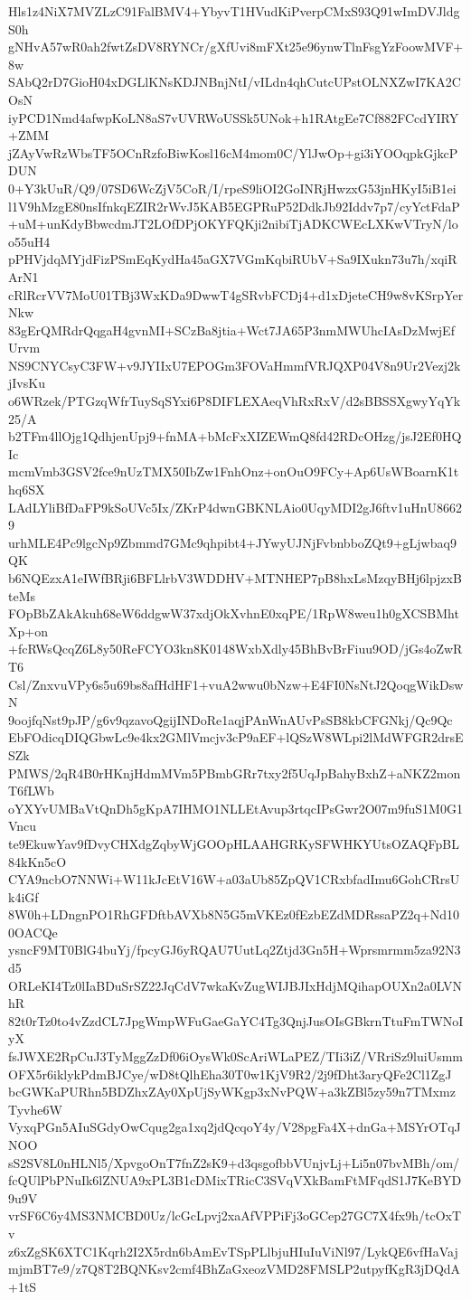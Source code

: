 Hls1z4NiX7MVZLzC91FalBMV4+YbyvT1HVudKiPverpCMxS93Q91wImDVJldgS0h
gNHvA57wR0ah2fwtZsDV8RYNCr/gXfUvi8mFXt25e96ynwTlnFsgYzFoowMVF+8w
SAbQ2rD7GioH04xDGLlKNsKDJNBnjNtI/vILdn4qhCutcUPstOLNXZwI7KA2COsN
iyPCD1Nmd4afwpKoLN8aS7vUVRWoUSSk5UNok+h1RAtgEe7Cf882FCcdYIRY+ZMM
jZAyVwRzWbsTF5OCnRzfoBiwKosl16cM4mom0C/YlJwOp+gi3iYOOqpkGjkcPDUN
0+Y3kUuR/Q9/07SD6WcZjV5CoR/I/rpeS9liOI2GoINRjHwzxG53jnHKyI5iB1ei
l1V9hMzgE80nsIfnkqEZIR2rWvJ5KAB5EGPRuP52DdkJb92Iddv7p7/cyYctFdaP
+uM+unKdyBbwcdmJT2LOfDPjOKYFQKji2nibiTjADKCWEcLXKwVTryN/loo55uH4
pPHVjdqMYjdFizPSmEqKydHa45aGX7VGmKqbiRUbV+Sa9IXukn73u7h/xqiRArN1
cRlRcrVV7MoU01TBj3WxKDa9DwwT4gSRvbFCDj4+d1xDjeteCH9w8vKSrpYerNkw
83gErQMRdrQqgaH4gvnMI+SCzBa8jtia+Wct7JA65P3nmMWUhcIAsDzMwjEfUrvm
NS9CNYCsyC3FW+v9JYIIxU7EPOGm3FOVaHmmfVRJQXP04V8n9Ur2Vezj2kjIvsKu
o6WRzek/PTGzqWfrTuySqSYxi6P8DIFLEXAeqVhRxRxV/d2sBBSSXgwyYqYk25/A
b2TFm4llOjg1QdhjenUpj9+fnMA+bMcFxXIZEWmQ8fd42RDcOHzg/jsJ2Ef0HQIc
mcmVmb3GSV2fce9nUzTMX50IbZw1FnhOnz+onOuO9FCy+Ap6UsWBoarnK1thq6SX
LAdLYliBfDaFP9kSoUVc5Ix/ZKrP4dwnGBKNLAio0UqyMDI2gJ6ftv1uHnU86629
urhMLE4Pc9lgcNp9Zbmmd7GMc9qhpibt4+JYwyUJNjFvbnbboZQt9+gLjwbaq9QK
b6NQEzxA1eIWfBRji6BFLlrbV3WDDHV+MTNHEP7pB8hxLsMzqyBHj6lpjzxBteMs
FOpBbZAkAkuh68eW6ddgwW37xdjOkXvhnE0xqPE/1RpW8weu1h0gXCSBMhtXp+on
+fcRWsQcqZ6L8y50ReFCYO3kn8K0148WxbXdly45BhBvBrFiuu9OD/jGs4oZwRT6
Csl/ZnxvuVPy6s5u69bs8afHdHF1+vuA2wwu0bNzw+E4FI0NsNtJ2QoqgWikDswN
9oojfqNst9pJP/g6v9qzavoQgijINDoRe1aqjPAnWnAUvPsSB8kbCFGNkj/Qc9Qc
EbFOdicqDIQGbwLc9e4kx2GMlVmcjv3cP9aEF+lQSzW8WLpi2lMdWFGR2drsESZk
PMWS/2qR4B0rHKnjHdmMVm5PBmbGRr7txy2f5UqJpBahyBxhZ+aNKZ2monT6fLWb
oYXYvUMBaVtQnDh5gKpA7IHMO1NLLEtAvup3rtqcIPsGwr2O07m9fuS1M0G1Vncu
te9EkuwYav9fDvyCHXdgZqbyWjGOOpHLAAHGRKySFWHKYUtsOZAQFpBL84kKn5cO
CYA9ncbO7NNWi+W11kJcEtV16W+a03aUb85ZpQV1CRxbfadImu6GohCRrsUk4iGf
8W0h+LDngnPO1RhGFDftbAVXb8N5G5mVKEz0fEzbEZdMDRssaPZ2q+Nd100OACQe
ysncF9MT0BlG4buYj/fpcyGJ6yRQAU7UutLq2Ztjd3Gn5H+Wprsmrmm5za92N3d5
ORLeKI4Tz0lIaBDuSrSZ22JqCdV7wkaKvZugWIJBJIxHdjMQihapOUXn2a0LVNhR
82t0rTz0to4vZzdCL7JpgWmpWFuGaeGaYC4Tg3QnjJusOIsGBkrnTtuFmTWNoIyX
fsJWXE2RpCuJ3TyMggZzDf06iOysWk0ScAriWLaPEZ/TIi3iZ/VRriSz9luiUsmm
OFX5r6iklykPdmBJCye/wD8tQlhEha30T0w1KjV9R2/2j9fDht3aryQFe2Cl1ZgJ
bcGWKaPURhn5BDZhxZAy0XpUjSyWKgp3xNvPQW+a3kZBl5zy59n7TMxmzTyvhe6W
VyxqPGn5AIuSGdyOwCqug2ga1xq2jdQcqoY4y/V28pgFa4X+dnGa+MSYrOTqJNOO
sS2SV8L0nHLNl5/XpvgoOnT7fnZ2sK9+d3qsgofbbVUnjvLj+Li5n07bvMBh/om/
fcQUlPbPNuIk6lZNUA9xPL3B1cDMixTRicC3SVqVXkBamFtMFqdS1J7KeBYD9u9V
vrSF6C6y4MS3NMCBD0Uz/lcGcLpvj2xaAfVPPiFj3oGCep27GC7X4fx9h/tcOxTv
z6xZgSK6XTC1Kqrh2I2X5rdn6bAmEvTSpPLlbjuHIuIuViNl97/LykQE6vfHaVaj
mjmBT7e9/z7Q8T2BQNKsv2cmf4BhZaGxeozVMD28FMSLP2utpyfKgR3jDQdA+1tS
